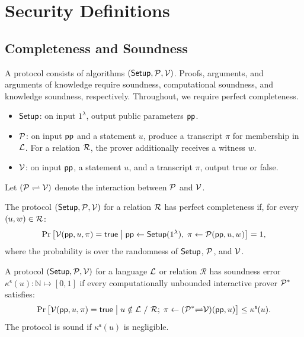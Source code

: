 \section{Security Definitions}
\label{appx:def}

\subsection{Completeness and Soundness}
\label{appx:soundness}
\begin{definition}
\label{def:proofArgumentAoK}
A protocol consists of algorithms $({\sf Setup},\mathcal{P},\mathcal{V})$.
Proofs, arguments, and arguments of knowledge require soundness,
computational soundness, and knowledge soundness, respectively.
Throughout, we require perfect completeness.
\begin{itemize}
    \item ${\sf Setup}$: on input $1^\lambda$, output public parameters ${\sf pp}$.
    \item $\mathcal{P}$: on input ${\sf pp}$ and a statement $u$, produce a transcript $\pi$
    for membership in $\mathcal{L}$. For a relation $\mathcal{R}$,
    the prover additionally receives a witness $w$.
    \item $\mathcal{V}$: on input ${\sf pp}$, a statement $u$, and a transcript $\pi$,
    output {\sf true} or {\sf false}.
\end{itemize}
Let ${(\mathcal{P} \rightleftharpoons \mathcal{V})}$ denote the interaction between $\mathcal{P}$ and $\mathcal{V}$.
\end{definition}

\begin{definition}
\label{def:perfect-completeness}
The protocol $({\sf Setup},\mathcal{P},\mathcal{V})$ for a relation \(\mathcal{R}\)
has perfect completeness if, for every \((u,w)\in\mathcal{R}\):
\[
    \Pr\left[
        \mathcal{V}({\sf pp},u,\pi)={\sf true}
        \;\middle|\;
        {\sf pp}\leftarrow{\sf Setup}(1^\lambda),\;
        \pi\leftarrow\mathcal{P}({\sf pp},u,w)
    \right]
    =1,
\]
where the probability is over the randomness of
\({\sf Setup}\), \(\mathcal{P}\), and \(\mathcal{V}\).
\end{definition}

\begin{definition}
\label{def:soundness}
A protocol $({\sf Setup},\mathcal{P},\mathcal{V})$ for a language
$\mathcal{L}$ or relation $\mathcal R$ has soundness error
$\kappa^\mathsf{s}(u)\colon\mathbb N\mapsto[0,1]$ if every
computationally unbounded interactive prover $\mathcal{P}^*$ satisfies:
\[
    \Pr\left[
        \mathcal{V}({\sf pp},u,\pi)={\sf true}
        \;\middle|\;
        \begin{gathered}
            u\notin\mathcal{L}~/~\mathcal{R};\;
            \pi\leftarrow(\mathcal{P}^*{\rightleftharpoons}\mathcal{V})({\sf pp},u)
        \end{gathered}
    \right]
    \leq\kappa^\mathsf{s}(u).
\]
The protocol is sound if $\kappa^\mathsf{s}(u)$ is negligible.
\end{definition}

